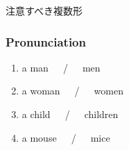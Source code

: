 \documentclass[aspectratio=169,xcolor={dvipsnames,table}]{beamer}
\newcommand{\myaudio}[1]{\href{#1}{\faVolumeUp}}
\begin{document}
\begin{frame}[plain]{注意すべき複数形}
 \pause\hspace{190pt}{\LARGE a mouse}%
\pause{}


\bigskip

\bigskip

\pause{}%
\pause{}


\bigskip

\bigskip

\mbox{}\hfill\myaudio{./audio/005_singular_plural_11.mp3}
\end{frame}
\begin{frame}[plain]\frametitle{Pronunciation}

\begin{enumerate}
 \item a man~~~\pause{}/~~~men\pause
 \item a woman~~~\pause{}/~~~women\pause
 \item a child~~~\pause{}/~~~children\pause
 \item a mouse~~~\pause{}/~~~mice
  \end{enumerate}
\pause

\bigskip

\bigskip

\mbox{}\hfill\myaudio{./audio/005_singular_plural_12.mp3}
\end{frame}
\end{document}

